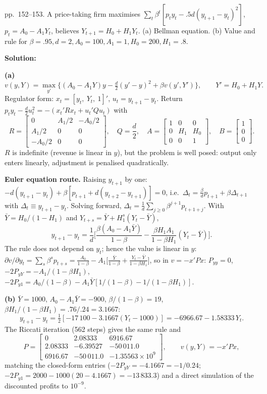 \documentclass[12pt, letterpaper]{article}
\begin{document}
\begin{tcolorbox}[oddbox,title={Exercise 5.11 \quad Firm-level adjustment costs}]
\begin{tcolorbox}[questionbox]
pp.~152--153. A price-taking firm maximises $\sum_t\beta^t[p_ty_t-.5d(y_{t+1}-y_t)^2]$,
$p_t=A_0-A_1Y_t$, believes $Y_{t+1}=H_0+H_1Y_t$. (a) Bellman equation. (b) Value and rule for
$\beta=.95,d=2,A_0=100,A_1=1,H_0=200,H_1=.8$.
\end{tcolorbox}

\textbf{Solution:}

\textbf{(a)}
\[
v(y,Y)=\max_{y'}\big\{(A_0-A_1Y)y-\tfrac d2(y'-y)^2+\beta v(y',Y')\big\},\qquad Y'=H_0+H_1Y.
\]
Regulator form: $x_t=[y_t,\ Y_t,\ 1]'$, $u_t=y_{t+1}-y_t$. Return
$p_ty_t-\tfrac d2u_t^2=-(x_t'Rx_t+u_t'Qu_t)$ with
\[
R=\begin{bmatrix}0&A_1/2&-A_0/2\\A_1/2&0&0\\-A_0/2&0&0\end{bmatrix},\quad Q=\frac d2,\quad
A=\begin{bmatrix}1&0&0\\0&H_1&H_0\\0&0&1\end{bmatrix},\quad B=\begin{bmatrix}1\\0\\0\end{bmatrix}.
\]
$R$ is indefinite (revenue is linear in $y$), but the problem is well posed: output only enters
linearly, adjustment is penalised quadratically.

\textbf{Euler equation route.} Raising $y_{t+1}$ by one: $-d(y_{t+1}-y_t)+\beta[p_{t+1}+d(y_{t+2}-y_{t+1})]=0$,
i.e.\ $\Delta_t=\tfrac\beta dp_{t+1}+\beta\Delta_{t+1}$ with $\Delta_t\equiv y_{t+1}-y_t$. Solving
forward, $\Delta_t=\frac1d\sum_{j\ge0}\beta^{j+1}p_{t+1+j}$. With $\bar Y=H_0/(1-H_1)$ and
$Y_{t+s}=\bar Y+H_1^s(Y_t-\bar Y)$,
\[
\boxed{y_{t+1}-y_t=\frac1d\Big[\frac{\beta(A_0-A_1\bar Y)}{1-\beta}-\frac{\beta H_1A_1}{1-\beta H_1}(Y_t-\bar Y)\Big].}
\]
The rule does not depend on $y_t$; hence the value is linear in $y$:
$\partial v/\partial y_t=\sum_s\beta^sp_{t+s}=\frac{A_0}{1-\beta}-A_1\Big[\frac{\bar Y}{1-\beta}+\frac{Y_t-\bar Y}{1-\beta H_1}\Big]$,
so in $v=-x'Px$: $P_{yy}=0$, $-2P_{yY}=-A_1/(1-\beta H_1)$,
$-2P_{y1}=A_0/(1-\beta)-A_1\bar Y[1/(1-\beta)-1/(1-\beta H_1)]$.

\textbf{(b)} $\bar Y=1000$, $A_0-A_1\bar Y=-900$, $\beta/(1-\beta)=19$, $\beta H_1/(1-\beta H_1)=.76/.24=3.1667$:
\[
y_{t+1}-y_t=\tfrac12[-17\,100-3.1667(Y_t-1000)]=-6966.67-1.58333\,Y_t .
\]
The Riccati iteration (562 steps) gives the same rule and
\[
P=\begin{bmatrix}0&2.08333&6916.67\\2.08333&-6.39527&-50\,011.0\\6916.67&-50\,011.0&-1.35563\times10^{9}\end{bmatrix},
\qquad v(y,Y)=-x'Px,
\]
matching the closed-form entries ($-2P_{yY}=-4.1667=-1/0.24$; $-2P_{y1}=2000-1000(20-4.1667)=-13\,833.3$)
and a direct simulation of the discounted profits to $10^{-9}$.


\end{tcolorbox}
\end{document}
